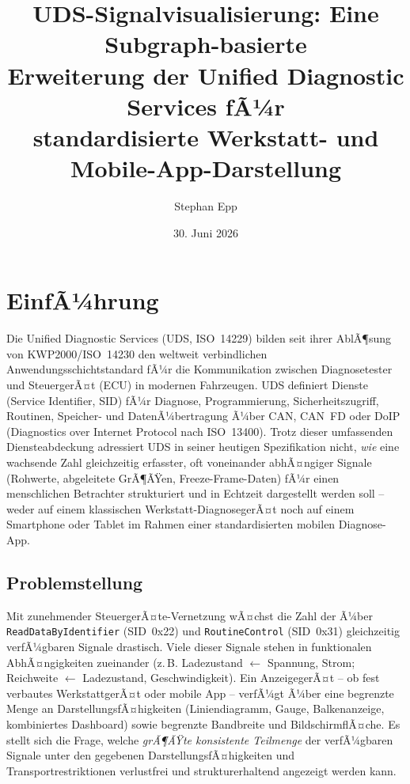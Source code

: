 ﻿\documentclass[a4paper,12pt]{article}
\title{UDS-Signalvisualisierung: Eine Subgraph-basierte\\
Erweiterung der Unified Diagnostic Services fÃ¼r\\
standardisierte Werkstatt- und Mobile-App-Darstellung}
\author{Stephan Epp}
\date{30. Juni 2026}
\theoremstyle{definition}
\begin{document}
\maketitle

\tableofcontents
\newpage

\section{EinfÃ¼hrung}

Die Unified Diagnostic Services (UDS, ISO~14229) bilden seit ihrer AblÃ¶sung von KWP2000/ISO~14230 den weltweit verbindlichen Anwendungsschichtstandard fÃ¼r die Kommunikation zwischen Diagnosetester und SteuergerÃ¤t (ECU) in modernen Fahrzeugen. UDS definiert Dienste (Service Identifier, SID) fÃ¼r Diagnose, Programmierung, Sicherheitszugriff, Routinen, Speicher- und DatenÃ¼bertragung Ã¼ber CAN, CAN~FD oder DoIP (Diagnostics over Internet Protocol nach ISO~13400). Trotz dieser umfassenden Diensteabdeckung adressiert UDS in seiner heutigen Spezifikation nicht, \emph{wie} eine wachsende Zahl gleichzeitig erfasster, oft voneinander abhÃ¤ngiger Signale (Rohwerte, abgeleitete GrÃ¶ÃŸen, Freeze-Frame-Daten) fÃ¼r einen menschlichen Betrachter strukturiert und in Echtzeit dargestellt werden soll -- weder auf einem klassischen Werkstatt-DiagnosegerÃ¤t noch auf einem Smartphone oder Tablet im Rahmen einer standardisierten mobilen Diagnose-App.

\subsection{Problemstellung}

Mit zunehmender SteuergerÃ¤te-Vernetzung wÃ¤chst die Zahl der Ã¼ber \texttt{ReadDataByIdentifier} (SID~0x22) und \texttt{RoutineControl} (SID~0x31) gleichzeitig verfÃ¼gbaren Signale drastisch. Viele dieser Signale stehen in funktionalen AbhÃ¤ngigkeiten zueinander (z.\,B. Ladezustand $\leftarrow$ Spannung, Strom; Reichweite $\leftarrow$ Ladezustand, Geschwindigkeit). Ein AnzeigegerÃ¤t -- ob fest verbautes WerkstattgerÃ¤t oder mobile App -- verfÃ¼gt Ã¼ber eine begrenzte Menge an DarstellungsfÃ¤higkeiten (Liniendiagramm, Gauge, Balkenanzeige, kombiniertes Dashboard) sowie begrenzte Bandbreite und BildschirmflÃ¤che. Es stellt sich die Frage, welche \emph{grÃ¶ÃŸte konsistente Teilmenge} der verfÃ¼gbaren Signale unter den gegebenen DarstellungsfÃ¤higkeiten und Transportrestriktionen verlustfrei und strukturerhaltend angezeigt werden kann.
\end{document}
